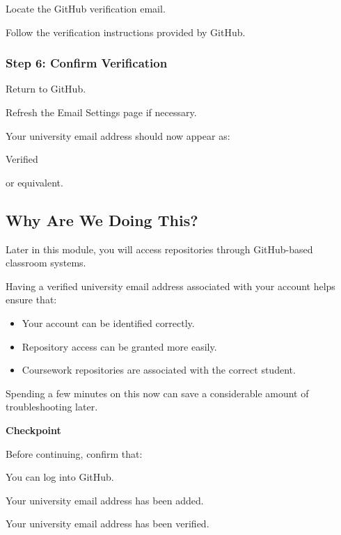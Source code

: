 \documentclass{csc2059practical}
\begin{document}
Locate the GitHub verification email.

Follow the verification instructions provided by GitHub.

\subsubsection{Step 6: Confirm Verification}
Return to GitHub.

Refresh the Email Settings page if necessary.

Your university email address should now appear as:

Verified

or equivalent.

\subsection{Why Are We Doing This?}
Later in this module, you will access repositories through GitHub-based classroom systems.

Having a verified university email address associated with your account helps ensure that:

\begin{itemize}
  \item Your account can be identified correctly.
  \item Repository access can be granted more easily.
  \item Coursework repositories are associated with the correct student.
\end{itemize}
Spending a few minutes on this now can save a considerable amount of troubleshooting later.

\begin{reflectionbox}
\textbf{Checkpoint}\par
\medskip

Before continuing, confirm that:


You can log into GitHub.


Your university email address has been added.


Your university email address has been verified.


\end{reflectionbox}
\end{document}
